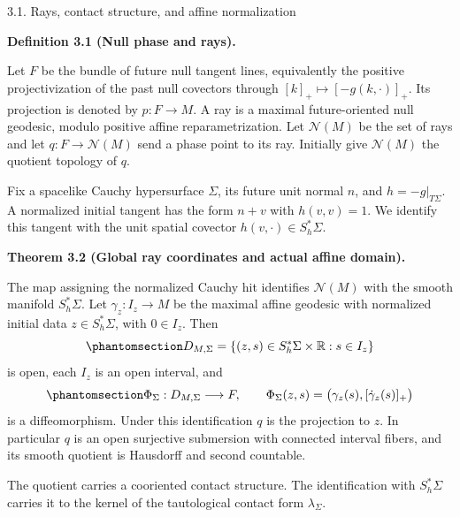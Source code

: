 \documentclass[
  english,
  11pt,
  reqno]{amsart}
\makeatletter
\newcommand{\pandocstatementheading}[1]{%
  \par\addpenalty{\@beginparpenalty}%
  \addvspace{.5\baselineskip plus .2\baselineskip minus .2\baselineskip}%
  {\normalfont\bfseries #1\par}%
  \nobreak\@afterindenttrue\@afterheading
}
\newcommand{\paperstatementsection}{\@startsection{subsection}{2}%
  \z@{.5\linespacing\@plus.7\linespacing}{.35\baselineskip}%
  {\normalfont\bfseries}}
\newcommand{\paperfirststatement}[1]{%
  {\normalfont\bfseries #1\par}%
  \nobreak\@afterindenttrue\@afterheading}
\makeatother
\begin{document}
\protect{}\label{sec:null-rays-and-affine-domains}
\paperstatementsection{3.1. Rays, contact structure, and affine
normalization}\label{rays-contact-structure-and-affine-normalization}
\paperfirststatement{\protect{}\label{def:global-null-ray-data}Definition 3.1 (Null phase and rays).}

Let \(F\) be the bundle of future null tangent lines, equivalently the
positive projectivization of the past null covectors through
\([k]_+\mapsto[-g(k,\cdot)]_+\). Its projection is denoted by
\(p:F\to M\). A ray is a maximal future-oriented null geodesic, modulo
positive affine reparametrization. Let \(\mathcal N(M)\) be the set of
rays and let \(q:F\to\mathcal N(M)\) send a phase point to its ray.
Initially give \(\mathcal N(M)\) the quotient topology of \(q\).

Fix a spacelike Cauchy hypersurface \(\Sigma\), its future unit normal
\(n\), and \(h=-g|_{T\Sigma}\). A normalized initial tangent has the
form \(n+v\) with \(h(v,v)=1\). We identify this tangent with the unit
spatial covector \(h(v,\cdot)\in S_h^*\Sigma\).

\pandocstatementheading{\protect{}\label{thm:global-real-ray-flow}Theorem 3.2 (Global ray coordinates and actual affine domain).}

The map assigning the normalized Cauchy hit identifies \(\mathcal N(M)\)
with the smooth manifold \(S_h^*\Sigma\). Let \(\gamma_z:I_z\to M\) be
the maximal affine geodesic with normalized initial data
\(z\in S_h^*\Sigma\), with \(0\in I_z\). Then
\begin{equation}\protect\phantomsection\label{eq:global-real-affine-domain}{
D_{M,\Sigma}=\{(z,s)\in S_h^*\Sigma\times\mathbb R:s\in I_z\}
}\end{equation} is open, each \(I_z\) is an open interval, and
\begin{equation}\protect\phantomsection\label{eq:global-real-affine-flow}{
\Phi_\Sigma:D_{M,\Sigma}\longrightarrow F,
\qquad
\Phi_\Sigma(z,s)=\bigl(\gamma_z(s),[\dot\gamma_z(s)]_+\bigr)
}\end{equation} is a diffeomorphism. Under this identification \(q\) is
the projection to \(z\). In particular \(q\) is an open surjective
submersion with connected interval fibers, and its smooth quotient is
Hausdorff and second countable.

The quotient carries a cooriented contact structure. The identification
with \(S_h^*\Sigma\) carries it to the kernel of the tautological
contact form \(\lambda_\Sigma\).
\end{document}
